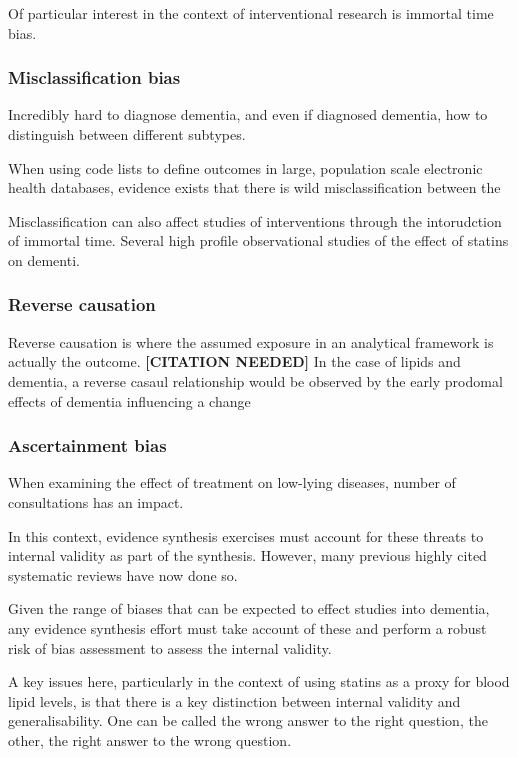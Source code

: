 \documentclass[a4paper,nobind]{templates/ociamthesis}
\begin{document}
Of particular interest in the context of interventional research is immortal time bias.

\hypertarget{misclassification-bias}{%
\subsubsection{Misclassification bias}\label{misclassification-bias}}

Incredibly hard to diagnose dementia, and even if diagnosed dementia, how to distinguish between different subtypes.

When using code lists to define outcomes in large, population scale electronic health databases, evidence exists that there is wild misclassification between the

Misclassification can also affect studies of interventions through the intorudction of immortal time. Several high profile observational studies of the effect of statins on dementi.

\hypertarget{reverse-causation}{%
\subsubsection{Reverse causation}\label{reverse-causation}}

Reverse causation is where the assumed exposure in an analytical framework is actually the outcome. \textbf{{[}CITATION NEEDED{]}} In the case of lipids and dementia, a reverse casaul relationship would be observed by the early prodomal effects of dementia influencing a change

\hypertarget{ascertainment-bias}{%
\subsubsection{Ascertainment bias}\label{ascertainment-bias}}

When examining the effect of treatment on low-lying diseases, number of consultations has an impact.

In this context, evidence synthesis exercises must account for these threats to internal validity as part of the synthesis. However, many previous highly cited systematic reviews have now done so.

Given the range of biases that can be expected to effect studies into dementia, any evidence synthesis effort must take account of these and perform a robust risk of bias assessment to assess the internal validity.

A key issues here, particularly in the context of using statins as a proxy for blood lipid levels, is that there is a key distinction between internal validity and generalisability. One can be called the wrong answer to the right question, the other, the right answer to the wrong question.
\end{document}
